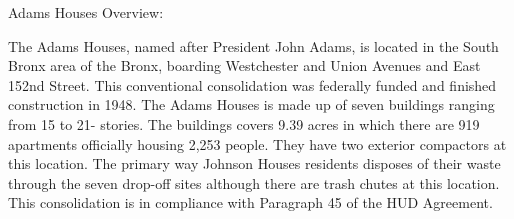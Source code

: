 Adams Houses Overview:

The Adams Houses, named after President John Adams,  is located in the South Bronx area of the Bronx, boarding Westchester and Union Avenues and East 152nd Street. This conventional consolidation was federally funded and finished construction in 1948. The Adams Houses is made up of seven buildings ranging from 15 to 21- stories.  The buildings covers 9.39 acres in which there are 919 apartments officially housing 2,253 people. They have two exterior compactors at this location. The primary way Johnson Houses residents disposes of their waste through the seven drop-off sites although there are trash chutes at this location. This consolidation is in compliance with Paragraph 45 of the HUD Agreement. 